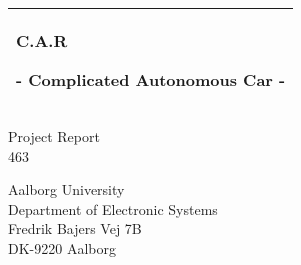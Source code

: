 
%
\begin{titlepage}
  \addtolength{\hoffset}{0.5\evensidemargin-0.5\oddsidemargin} %
  \noindent%
  \begin{tabular}{@{}p{\textwidth}@{}}
    \toprule[2pt]
    \midrule
    \vspace{0.2cm}
    \begin{center}
    \Huge{\textbf{
      C.A.R%
    }}
    \end{center}
    \begin{center}
      \Large{
        - Complicated Autonomous Car -%
      }
    \end{center}
    \vspace{0.2cm}\\
    \midrule
    \toprule[2pt]
  \end{tabular}
  \vspace{0.1 cm}
  
  \begin{center}
   {\large
      Project Report%
    }\\
    \vspace{0.2cm}
    {\Large
      463\\%
      \vspace{0.8 cm}
    }

  \end{center}
  \vfill
  \begin{center}
  Aalborg University\\
  Department of Electronic Systems\\
  Fredrik Bajers Vej 7B\\
  DK-9220 Aalborg\\
  \end{center}
\end{titlepage}
\clearpage

